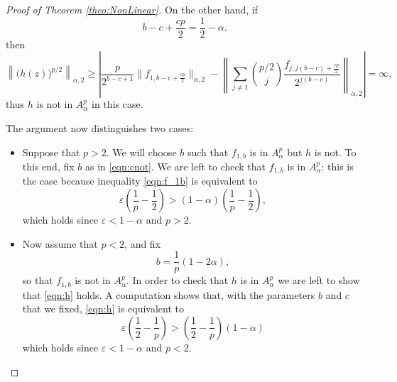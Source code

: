 \documentclass[12pt]{amsart}
\theoremstyle{definition}
\numberwithin{equation}{section}
\begin{document}
\begin{proof}[Proof of Theorem \ref{theo:NonLinear}]
            On the other hand, if 
                \begin{equation}
                \label{eqn:cnot}
                    b-c+\frac{cp}{2}=\frac{1}{2}-\alpha.
                \end{equation}
                then
                \[
                    \left\|\big(h(z)\big)^{p/2}\right\|_{\alpha, 2}\ge\left| \frac{p}{2^{b-c+1}}\|f_{1, b-c+\frac{cp}{2}}\|_{\alpha, 2}- \left \| \sum_{j \ne1} \binom{p/2}{j} \frac{f_{j,j(b-c) + \frac{cp}{2}}}{2^{j(b-c)}} \right \|_{\alpha, 2} \right|=\infty,
                \]
                thus $h$ is not in $A^p_\alpha$ in this case.
        
            The argument now distinguishes two cases:
                \begin{itemize}
                
                    \item Suppose that $p>2$. We will choose $b$ such that $f_{1, b}$ is in $A^p_\alpha$ but $h$ is not. To this end, fix $b$ as in \eqref{eqn:cnot}. We are left to check that $f_{1, b}$ is in $A^p_\alpha$: this is the case because inequality \eqref{eqn:f_1b} is equivalent to 
                     \[
                     \varepsilon\left(\frac{1}{p}-\frac{1}{2}\right)>(1-\alpha)\left(\frac{1}{p}-\frac{1}{2}\right),
                     \]
                    which holds since $\varepsilon<1-\alpha$ and $p>2$.
                     
                    \item Now assume that $p<2$, and fix 
                    \[
                    b=\frac{1}{p}(1-2\alpha),
                    \]
                    so that $f_{1, b}$ is not in $A^p_\alpha$. In order to check that $h$ is in $A^p_\alpha$ we are left to show that \eqref{eqn:h} holds. A computation shows that, with the parameters $b$ and $c$ that we fixed, \eqref{eqn:h} is equivalent to 
                    \[
                    \varepsilon\left(\frac{1}{2}-\frac{1}{p}\right)>\left(\frac{1}{2}-\frac{1}{p}\right)(1-\alpha)
                    \]
                    which holds since $\varepsilon<1-\alpha$ and $p<2$.
                \end{itemize}
        \end{proof}
\end{document}
